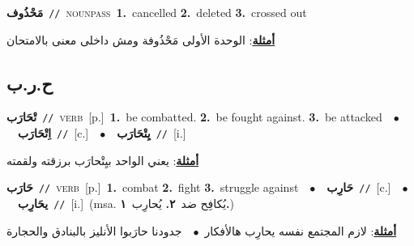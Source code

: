 \documentclass[10pt,a4paper,twoside]{article} %
\begin{document}
\begin{multicols}{2}
{\setlength\topsep{0pt}\textbf{\foreignlanguage{arabic}{مَحْذُوف}}\ {\color{gray}\texttt{//}\color{black}}\ \textsc{noun\textunderscore pass}\ \textbf{1.}~cancelled  \textbf{2.}~deleted  \textbf{3.}~crossed out\  \begin{flushright}\color{gray}\foreignlanguage{arabic}{\textbf{\underline{\foreignlanguage{arabic}{أمثلة}}}: الوحدة الأولى مَحْذُوفة ومش داخلى معنى بالامتحان}\end{flushright}\color{black}} \vspace{2mm}

\vspace{-3mm}
\subsection*{\color{blue}\foreignlanguage{arabic}{ح.ر.ب}\color{blue}{}} 

{\setlength\topsep{0pt}\textbf{\foreignlanguage{arabic}{تْحَارَب}}\ {\color{gray}\texttt{//}\color{black}}\ \textsc{verb}\ [p.]\ \textbf{1.}~be combatted.  \textbf{2.}~be fought against.  \textbf{3.}~be attacked\ \ $\bullet$\ \ \setlength\topsep{0pt}\textbf{\foreignlanguage{arabic}{اِتْحَارَب}}\ {\color{gray}\texttt{//}\color{black}}\ [c.]\ \ $\bullet$\ \ \setlength\topsep{0pt}\textbf{\foreignlanguage{arabic}{يِتْحَارَب}}\ {\color{gray}\texttt{//}\color{black}}\ [i.]\  \begin{flushright}\color{gray}\foreignlanguage{arabic}{\textbf{\underline{\foreignlanguage{arabic}{أمثلة}}}: يعني الواحد بيِتْحارَب برزقته ولقمته}\end{flushright}\color{black}} \vspace{2mm}

{\setlength\topsep{0pt}\textbf{\foreignlanguage{arabic}{حَارَب}}\ {\color{gray}\texttt{//}\color{black}}\ \textsc{verb}\ [p.]\ \textbf{1.}~combat  \textbf{2.}~fight  \textbf{3.}~struggle against\ \ $\bullet$\ \ \setlength\topsep{0pt}\textbf{\foreignlanguage{arabic}{حَارِب}}\ {\color{gray}\texttt{//}\color{black}}\ [c.]\ \ $\bullet$\ \ \setlength\topsep{0pt}\textbf{\foreignlanguage{arabic}{يحَارِب}}\ {\color{gray}\texttt{//}\color{black}}\ [i.]\ \color{gray}(msa. \foreignlanguage{arabic}{يُكافِح ضد}~\foreignlanguage{arabic}{\textbf{٢.}}  \foreignlanguage{arabic}{يُحارِب}~\foreignlanguage{arabic}{\textbf{١.}})\color{black}\  \begin{flushright}\color{gray}\foreignlanguage{arabic}{\textbf{\underline{\foreignlanguage{arabic}{أمثلة}}}: لازم المجتمع نفسه يحارِب هالأفكار\ $\bullet$\ \  جدودنا حارَبوا الأنليز بالبنادق والحجارة}\end{flushright}\color{black}} \vspace{2mm}


\end{multicols}
\end{document}
